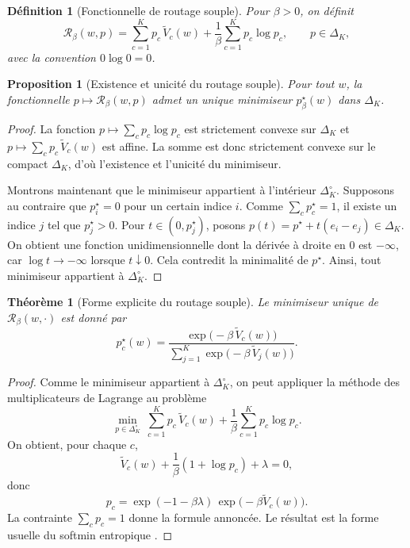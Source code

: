 \documentclass[11pt,a4paper]{article}
\newtheorem{definition}{Définition}[section]
\newtheorem{proposition}{Proposition}[section]
\newtheorem{theorem}{Théorème}[section]
\newcommand{\Rcal}{\mathcal R}
\begin{document}
\begin{definition}[Fonctionnelle de routage souple]
Pour \(\beta>0\), on définit
\[
\Rcal_\beta(w,p)
=
\sum_{c=1}^K p_c\,\widetilde V_c(w)
+\frac{1}{\beta}\sum_{c=1}^K p_c\log p_c,
\qquad p\in\Delta_K,
\]
avec la convention \(0\log 0=0\).
\end{definition}

\begin{proposition}[Existence et unicité du routage souple]
Pour tout \(w\), la fonctionnelle \(p\mapsto \Rcal_\beta(w,p)\) admet un unique minimiseur \(p^\star_\beta(w)\) dans \(\Delta_K\).
\end{proposition}

\begin{proof}
La fonction \(p\mapsto \sum_c p_c\log p_c\) est strictement convexe sur \(\Delta_K\) et \(p\mapsto \sum_c p_c\,\widetilde V_c(w)\) est affine. La somme est donc strictement convexe sur le compact \(\Delta_K\), d'où l'existence et l'unicité du minimiseur.

Montrons maintenant que le minimiseur appartient à l'intérieur \(\Delta_K^\circ\). Supposons au contraire que \(p^\star_i=0\) pour un certain indice \(i\). Comme \(\sum_c p^\star_c=1\), il existe un indice \(j\) tel que \(p^\star_j>0\). Pour \(t\in(0,p^\star_j)\), posons \(p(t)=p^\star+t(e_i-e_j)\in\Delta_K\). On obtient une fonction unidimensionnelle dont la dérivée à droite en \(0\) est \(-\infty\), car \(\log t\to-\infty\) lorsque \(t\downarrow 0\). Cela contredit la minimalité de \(p^\star\). Ainsi, tout minimiseur appartient à \(\Delta_K^\circ\).
\end{proof}

\begin{theorem}[Forme explicite du routage souple]
Le minimiseur unique de \(\Rcal_\beta(w,\cdot)\) est donné par
\[
p_c^\star(w)=\frac{\exp\!\bigl(-\beta\,\widetilde V_c(w)\bigr)}
{\sum_{j=1}^K \exp\!\bigl(-\beta\,\widetilde V_j(w)\bigr)}.
\]
\end{theorem}

\begin{proof}
Comme le minimiseur appartient à \(\Delta_K^\circ\), on peut appliquer la méthode des multiplicateurs de Lagrange au problème
\[
\min_{p\in\Delta_K^\circ}\ \sum_{c=1}^K p_c\,\widetilde V_c(w)+\frac{1}{\beta}\sum_{c=1}^K p_c\log p_c.
\]
On obtient, pour chaque \(c\),
\[
\widetilde V_c(w)+\frac{1}{\beta}(1+\log p_c)+\lambda=0,
\]
donc
\[
p_c=\exp(-1-\beta\lambda)\,\exp\!\bigl(-\beta\widetilde V_c(w)\bigr).
\]
La contrainte \(\sum_c p_c=1\) donne la formule annoncée. Le résultat est la forme usuelle du softmin entropique \cite{BauschkeCombettes2017,RockafellarWets1998}.
\end{proof}
\end{document}
